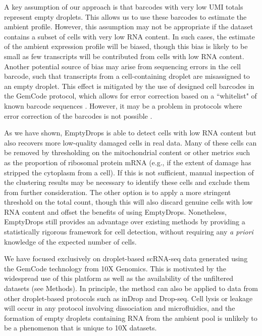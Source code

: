 \documentclass[10pt,letterpaper]{article}
\begin{document}
A key assumption of our approach is that barcodes with very low UMI totals represent empty droplets.
This allows us to use these barcodes to estimate the ambient profile.
However, this assumption may not be appropriate if the dataset contains a subset of cells with very low RNA content.
In such cases, the estimate of the ambient expression profile will be biased, though this bias is likely to be small as few transcripts will be contributed from cells with low RNA content.
Another potential source of bias may arise from sequencing errors in the cell barcode, such that transcripts from a cell-containing droplet are misassigned to an empty droplet.
This effect is mitigated by the use of designed cell barcodes in the GemCode protocol, which allows for error correction based on a ``whitelist" of known barcode sequences \cite{zheng2017massively}.
However, it may be a problem in protocols where error correction of the barcodes is not possible \cite{macosko2015highly}.


As we have shown, EmptyDrops is able to detect cells with low RNA content but also recovers more low-quality damaged cells in real data.
Many of these cells can be removed by thresholding on the mitochondrial content
or other metrics such as the proportion of ribosomal protein mRNA (e.g., if the extent of damage has stripped the cytoplasm from a cell).
If this is not sufficient, manual inspection of the clustering results may be necessary to identify these cells and exclude them from further consideration.
The other option is to apply a more stringent threshold on the total count, though this will also discard genuine cells with low RNA content and offset the benefits of using EmptyDrops.
Nonetheless, EmptyDrops still provides an advantage over existing methods by providing a statistically rigorous framework for cell detection, 
without requiring any \textit{a priori} knowledge of the expected number of cells.

We have focused exclusively on droplet-based scRNA-seq data generated using the GemCode technology from 10X Genomics.
This is motivated by the widespread use of this platform as well as the availability of the unfiltered datasets (see Methods).
In principle, the method can also be applied to data from other droplet-based protocols such as inDrop and Drop-seq. 
Cell lysis or leakage will occur in any protocol involving dissociation and microfluidics,
and the formation of empty droplets containing RNA from the ambient pool is unlikely to be a phenomenon that is unique to 10X datasets.
\end{document}
